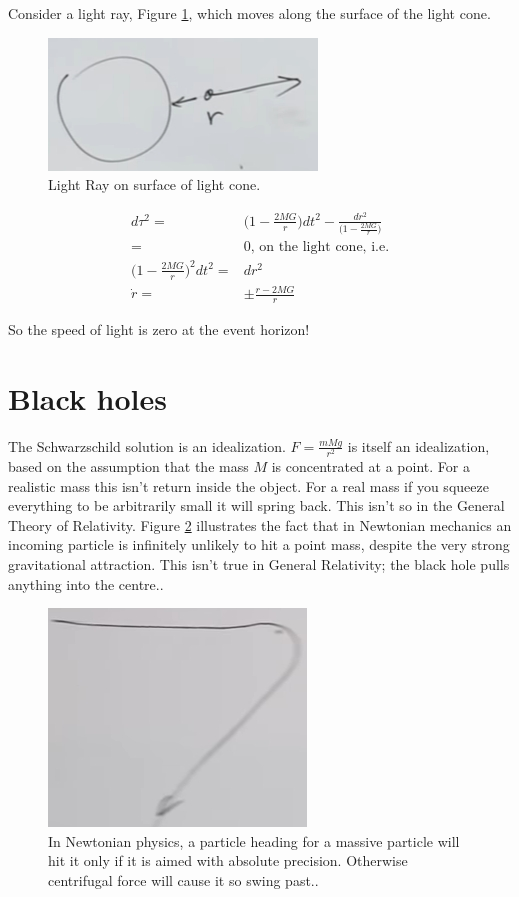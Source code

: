 \documentclass[]{article}
\begin{document}
{Consider a light ray, Figure \ref{fig:gr-5-lightray}, which moves along the surface of the light cone.
 
\begin{figure}[H]
	\caption{Light Ray on surface of light cone.}\label{fig:gr-5-lightray}
	\includegraphics{gr-5-lightray}
\end{figure}

\begin{align*}
	d \tau^2 =& \bigg(1-\frac{2 MG}{ r}\bigg) dt^2 - \frac{dr^2}{\bigg(1-\frac{2 MG}{ r}\bigg)}\\
	=& 0 \text{, on the light cone, i.e.}\\
	\bigg(1-\frac{2 MG}{ r}\bigg)^2 dt^2 =& dr^2\\
	\dot{r} =& \pm \frac{r-2MG}{r}
\end{align*}

So the speed of light is zero at the event horizon!


\section{Black holes}


The Schwarzschild solution is an idealization. $F = \frac{mMg}{r^2}$ is itself an idealization, based on the assumption that the mass $M$ is concentrated at a point. For a realistic mass this isn't return inside the object. For a real mass if you squeeze everything to be arbitrarily small it will spring back. This isn't so in the General Theory of Relativity. Figure \ref{fig:gr-6-centrifugal-force} illustrates the fact that in Newtonian mechanics an incoming particle is infinitely unlikely to hit a point mass, despite the very strong gravitational attraction. This isn't true in General Relativity; the black hole pulls anything into the centre..

\begin{figure}[H]
	\caption[Centrifugal force]{In Newtonian physics, a particle heading for a massive particle will hit it only if it is aimed with absolute precision. Otherwise centrifugal force will cause it so swing past..}\label{fig:gr-6-centrifugal-force}
	\includegraphics{gr-6-centrifugal-force}
\end{figure} 

}
\end{document}
